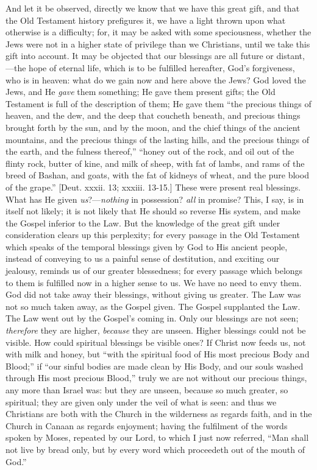 And let it be observed, directly we know that we have this great
gift, and that the Old Testament history prefigures it, we have a
light thrown upon what otherwise is a difficulty; for, it may be asked
with some speciousness, whether the Jews were not in a higher state of
privilege than we Christians, until we take this gift into account. It
may be objected that our blessings are all future or distant,—the
hope of eternal life, which is to be fulfilled hereafter, God's
forgiveness, who is in heaven: what do we gain now and here above the
Jews? God loved the Jews, and He \emph{gave} them something; He gave
them present gifts; the Old Testament is full of the description of
them; He gave them ``the precious things of heaven, and the dew,
and the deep that coucheth beneath, and precious things brought forth
by the sun, and by the moon, and the chief things of the ancient
mountains, and the precious things of the lasting hills, and the
precious things of the earth, and the fulness thereof,''
``honey out of the rock, and oil out of the flinty rock, butter of
kine, and milk of sheep, with fat of lambs, and rams of the breed of
Bashan, and goats, with the fat of kidneys of wheat, and the pure
blood of the grape.'' [Deut. xxxii. 13; xxxiii. 13-15.] These were
present real blessings. What has He given \emph{us}?—\emph{nothing}
in possession? \emph{all} in promise? This, I say, is in itself not
likely; it is not likely that He should so reverse His system, and
make the Gospel inferior to the Law. But the knowledge of the great
gift under consideration clears up this perplexity; for every passage
in the Old Testament which speaks of the temporal blessings given by
God to His ancient people, instead of conveying to us a painful sense
of destitution, and exciting our jealousy, reminds us of our greater
blessedness; for every passage which belongs to them is fulfilled now
in a higher sense to us. We have no need to envy them. God did not
take away their blessings, without giving us greater. The Law was not
so much taken away, as the Gospel given. The Gospel supplanted the
Law. The Law went out by the Gospel's coming in. Only our blessings
are not seen; \emph{therefore} they are higher, \emph{because} they
are unseen. Higher blessings could not be visible. How could spiritual
blessings be visible ones? If Christ now feeds us, not with milk and
honey, but ``with the spiritual food of His most precious Body and
Blood;'' if ``our sinful bodies are made clean by His Body,
and our souls washed through His most precious Blood,'' truly we
are not without our precious things, any more than Israel was: but
they are unseen, because so much greater, so spiritual; they are given
only under the veil of what is seen: and thus we Christians are both
with the Church in the wilderness as regards faith, and in the Church
in Canaan as regards enjoyment; having the fulfilment of the words
spoken by Moses, repeated by our Lord, to which I just now referred,
``Man shall not live by bread only, but by every word which
proceedeth out of the mouth of God.''

